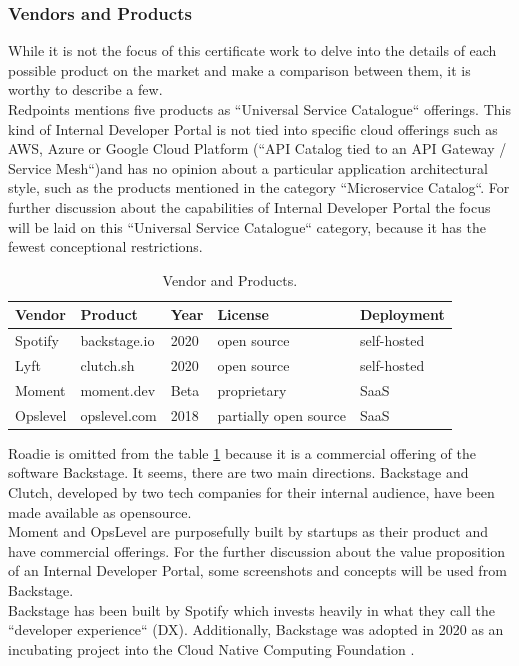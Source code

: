 \documentclass[a4paper,12pt]{article}
\begin{document}
    \subsubsection{Vendors and Products}
    \label{sssec:vendors}
    While it is not the focus of this certificate work to delve into the details of each possible product on the market
    and make a comparison between them, it is worthy to describe a few.\\
    Redpoints mentions five products as ``Universal Service Catalogue`` offerings\parencite{devportalsprimer}.
    This kind of Internal Developer Portal is not tied into specific cloud offerings such as AWS, Azure or Google
    Cloud Platform (``API Catalog tied to an API Gateway / Service Mesh``)and has no opinion about a particular application
    architectural style, such as the products mentioned in the category ``Microservice Catalog``.
    For further discussion about the capabilities of Internal Developer Portal the focus will be laid on this
    ``Universal Service Catalogue`` category, because it has the fewest conceptional restrictions.\\
    \begin{table}[!htbp]
        \begin{center}
            \begin{tabularx}{\textwidth}{lllll}
                \toprule
                Vendor   & Product      & Year & License               & Deployment  \\
                \midrule
                Spotify  & backstage.io & 2020 & open source           & self-hosted \\
                Lyft     & clutch.sh    & 2020 & open source           & self-hosted \\
                Moment   & moment.dev   & Beta & proprietary           & SaaS        \\
                Opslevel & opslevel.com & 2018 & partially open source & SaaS        \\
                \bottomrule
            \end{tabularx}
            \caption{\label{tab:vendors} Vendor and Products.}
        \end{center}
    \end{table}
    Roadie is omitted from the table \ref{tab:vendors} because it is a commercial offering of the software Backstage.
    It seems, there are two main directions.
    Backstage and Clutch, developed by two tech companies for their internal audience, have been made
    available as opensource.\\
    Moment and OpsLevel are purposefully built by startups as their product and have commercial offerings.
    For the further discussion about the value proposition of an Internal Developer Portal, some screenshots and concepts will
    be used from Backstage.\\
    Backstage has been built by Spotify which invests heavily in what they call the
    ``developer experience`` (DX)\parencite{spotifydx}.
    Additionally, Backstage was adopted in 2020 as an incubating project into the Cloud Native Computing Foundation\parencite{cncf} .
\end{document}
